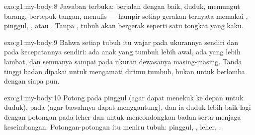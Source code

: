 \begin{solution}{exo:g1:my-body:8}
Jawaban terbuka: berjalan dengan baik, duduk, memungut barang,
bertepuk tangan, menulis --- hampir setiap gerakan ternyata memakai
, pinggul, ,  atau . Tanpa , tubuh
akan bergerak seperti satu tongkat yang kaku.
\end{solution}

\begin{solution}{exo:g1:my-body:9}
Bahwa setiap tubuh itu wajar pada ukurannya sendiri dan pada
kecepatannya sendiri: ada anak yang tumbuh lebih awal, ada yang lebih
lambat, dan semuanya sampai pada ukuran dewasanya masing-masing. Tanda
tinggi badan dipakai untuk mengamati dirimu tumbuh, bukan untuk
berlomba dengan siapa pun.
\end{solution}

\begin{solution}{exo:g1:my-body:10}
Potong pada pinggul (agar  dapat menekuk ke depan untuk
duduk), pada  (agar  bawahnya dapat menggantung), dan ia
duduk lebih baik lagi dengan potongan pada leher dan  untuk
mencondongkan badan serta menjaga keseimbangan. Potongan-potongan itu
meniru  tubuh: pinggul, , leher, .
\end{solution}
